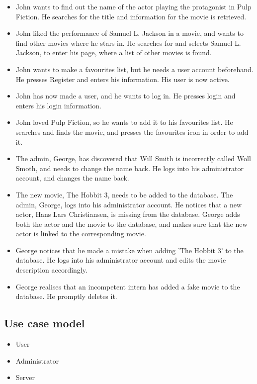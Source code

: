 \begin{itemize}
	\setlength{\itemsep}{-5pt}
	
	\item John wants to find out the name of the actor playing the protagonist in Pulp Fiction. He searches for the title and information for the movie is retrieved.
	\item John liked the performance of Samuel L. Jackson in a movie, and wants to find other movies where he stars in. He searches for and selects Samuel L. Jackson, to enter his page, where a list of other movies is found.
	\item John wants to make a favourites list, but he needs a user account beforehand. He presses Register and enters his information. His user is now active.
	\item John has now made a user, and he wants to log in. He presses login and enters his login information.
	\item John loved Pulp Fiction, so he wants to add it to his favourites list. He searches and finds the movie, and presses the favourites icon in order to add it.
	
	\item The admin, George, has discovered that Will Smith is incorrectly called Woll Smoth, and needs to change the name back. He logs into his administrator account, and changes the name back.
	\item The new movie, The Hobbit 3, needs to be added to the database. The admin, George, logs into his administrator account. He notices that a new actor, Hans Lars Christiansen, is missing from the database. George adds both the actor and the movie to the database, and makes sure that the new actor is linked to the corresponding movie.
	\item George notices that he made a mistake when adding 'The Hobbit 3' to the database. He logs into his administrator account and edits the movie description accordingly.
	\item George realises that an incompetent intern has added a fake movie to the database. He promptly deletes it.
\end{itemize}

\subsection{Use case model}



\begin{itemize}
	\setlength{\itemsep}{-5pt}
	\item User
	\item Administrator
	\item Server
\end{itemize}

